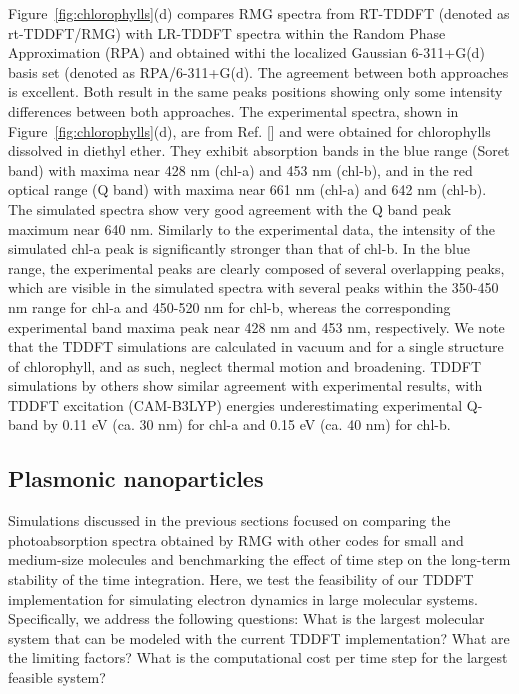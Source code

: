\documentclass[journal=jctcce,manuscript=article,etalmode=truncate,maxauthors=10,layout=twocolumn,9pt]{achemso}   %
\begin{document}
Figure~\ref{fig:chlorophylls}(d)  compares RMG spectra from RT-TDDFT  (denoted  as rt-TDDFT/RMG) with  LR-TDDFT spectra within the Random Phase Approximation (RPA) and obtained withi the localized Gaussian  6-311+G(d) basis set (denoted as RPA/6-311+G(d). The agreement between both approaches is excellent. Both result in the same peaks positions  showing only some  intensity differences between both approaches.
The experimental spectra, shown in  Figure~\ref{fig:chlorophylls}(d), are from Ref. [] and were obtained for chlorophylls dissolved in diethyl ether. They exhibit absorption bands in the blue range (Soret band) with maxima near 428 nm (chl-a) and 453 nm (chl-b), and in the red optical range (Q band) with maxima near 661 nm (chl-a) and 642 nm (chl-b). The simulated spectra show very good agreement with the Q band peak maximum near 640 nm. Similarly to the experimental data, the intensity of the simulated chl-a peak is significantly stronger than that of chl-b. In the blue range, the experimental peaks are clearly composed of several overlapping peaks, which are visible in the simulated spectra with several peaks within the 350-450 nm range for chl-a and 450-520 nm for chl-b, whereas the corresponding experimental band maxima peak near 428 nm and 453 nm, respectively. We note that the TDDFT simulations are calculated in vacuum and for a single structure of chlorophyll, and as such, neglect thermal motion and broadening. TDDFT simulations by others \cite{chlorphylls-rubio} show similar agreement with experimental results, with TDDFT excitation (CAM-B3LYP) energies underestimating experimental Q-band by 0.11 eV (ca. 30 nm) for chl-a and 0.15 eV (ca. 40 nm) for chl-b.


\subsection{Plasmonic nanoparticles}

Simulations discussed in the previous sections focused on comparing the photoabsorption spectra obtained by RMG with other codes for small and medium-size molecules and benchmarking the effect of  time step on the long-term stability of the time integration. Here, we test the feasibility of our TDDFT implementation for simulating electron dynamics in large molecular systems.  Specifically, we address the following questions: What is the largest molecular system that can be modeled with the current TDDFT implementation? What are the limiting factors? What is the computational cost per time step for the largest feasible system?
\end{document}

